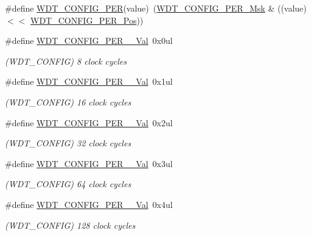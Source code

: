 \begin{DoxyCompactItemize}
\item 
\#define \mbox{\hyperlink{group___s_a_m_d21___w_d_t_gac92933c61d3b2a10b9b14e2c68dcc5c8}{W\+D\+T\+\_\+\+C\+O\+N\+F\+I\+G\+\_\+\+P\+ER}}(value)~(\mbox{\hyperlink{group___s_a_m_d21___w_d_t_ga7b17345103d170e4fc578db43ad0987e}{W\+D\+T\+\_\+\+C\+O\+N\+F\+I\+G\+\_\+\+P\+E\+R\+\_\+\+Msk}} \& ((value) $<$$<$ \mbox{\hyperlink{group___s_a_m_d21___w_d_t_ga55662a2fa7e16fd6cc7a5e0800034360}{W\+D\+T\+\_\+\+C\+O\+N\+F\+I\+G\+\_\+\+P\+E\+R\+\_\+\+Pos}}))
\item 
\#define \mbox{\hyperlink{group___s_a_m_d21___w_d_t_ga67ff519f465a8ba261805c93764095e1}{W\+D\+T\+\_\+\+C\+O\+N\+F\+I\+G\+\_\+\+P\+E\+R\+\_\+\_\+\+Val}}~0x0ul
\begin{DoxyCompactList}\small\item\em (W\+D\+T\+\_\+\+C\+O\+N\+F\+IG) 8 clock cycles \end{DoxyCompactList}\item 
\#define \mbox{\hyperlink{group___s_a_m_d21___w_d_t_ga52fe245666225114b46c8e12492eaf75}{W\+D\+T\+\_\+\+C\+O\+N\+F\+I\+G\+\_\+\+P\+E\+R\+\_\+\_\+\+Val}}~0x1ul
\begin{DoxyCompactList}\small\item\em (W\+D\+T\+\_\+\+C\+O\+N\+F\+IG) 16 clock cycles \end{DoxyCompactList}\item 
\#define \mbox{\hyperlink{group___s_a_m_d21___w_d_t_ga476aa4a908bb10ae56345f6d05462e17}{W\+D\+T\+\_\+\+C\+O\+N\+F\+I\+G\+\_\+\+P\+E\+R\+\_\+\_\+\+Val}}~0x2ul
\begin{DoxyCompactList}\small\item\em (W\+D\+T\+\_\+\+C\+O\+N\+F\+IG) 32 clock cycles \end{DoxyCompactList}\item 
\#define \mbox{\hyperlink{group___s_a_m_d21___w_d_t_ga8052f964d85b078482756ee563b3ca89}{W\+D\+T\+\_\+\+C\+O\+N\+F\+I\+G\+\_\+\+P\+E\+R\+\_\+\_\+\+Val}}~0x3ul
\begin{DoxyCompactList}\small\item\em (W\+D\+T\+\_\+\+C\+O\+N\+F\+IG) 64 clock cycles \end{DoxyCompactList}\item 
\#define \mbox{\hyperlink{group___s_a_m_d21___w_d_t_ga98986d614bb272ac1dab43e9d98f0beb}{W\+D\+T\+\_\+\+C\+O\+N\+F\+I\+G\+\_\+\+P\+E\+R\+\_\+\_\+\+Val}}~0x4ul
\begin{DoxyCompactList}\small\item\em (W\+D\+T\+\_\+\+C\+O\+N\+F\+IG) 128 clock cycles \end{DoxyCompactList}\item 
$$
\end{DoxyCompactItemize}
